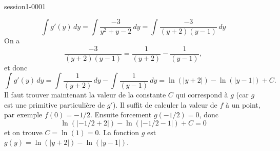 \begin{corrige}{session1-0001}
\begin{enumerate}
\begin{equation*}
   \int g'(y)\,dy =\int \frac{-3}{y^2 +y-2}\,dy = \int \frac{-3}{(y+2)(y-1)}\,dy
 \end{equation*}
On a 
\begin{equation*}
  \frac{-3}{(y+2)(y-1)} = \frac{1}{(y+2)} - \frac{1}{(y-1)},
\end{equation*}
et donc 
\begin{equation*}
 \int g'(y)\,dy = \int\frac{1}{(y+2)} \,dy - \int \frac{1}{(y-1)}\,dy = \ln(|y+2|) - \ln(|y-1|) +C. 
\end{equation*}
Il faut trouver maintenant la valeur de la constante $C$ qui correspond \`a $g$ (car $g$ est une primitive particuli\`ere de $g'$). Il suffit de calculer la valeur de $f$ \`a un point, par exemple $f(0) = -1/2$. Ensuite forcement $g(-1/2) = 0$, donc 
\begin{equation*}
  \ln(|-1/2+2|) - \ln(|-1/2-1|) +C =0
\end{equation*}
et on trouve $C =\ln(1) =0 $. La fonction $g$ est $g(y) =\ln(|y+2|) - \ln(|y-1|) $.
\end{enumerate}
\end{corrige}
